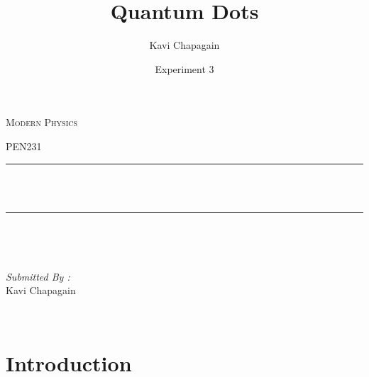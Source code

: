 \documentclass[12pt]{report}
\title{Quantum Dots}
\author{ Kavi Chapagain}
\date{Experiment 3}
\makeatletter
\let\thetitle\@title
\makeatother
\begin{document}

\begin{titlepage}
	\centering
    \vspace*{0.5 cm}
\begin{center}    \textsc{\Large   Modern Physics}\\[2.0 cm]	\end{center}%
	\textsc{\Large PEN231  }\\[0.5 cm]				%
	\rule{\linewidth}{0.2 mm} \\[0.4 cm]
	{ \huge \bfseries \thetitle}\\
	\rule{\linewidth}{0.2 mm} \\[1.5 cm]
	
	\begin{minipage}{0.4\textwidth}
		\begin{flushleft} \large
			\end{flushleft}
			\end{minipage}~
			\begin{minipage}{0.4\textwidth}
            
			\begin{flushright} \large
			\emph{Submitted By :} \\
			Kavi Chapagain  
		\end{flushright}
           
	\end{minipage}\\[2 cm]
	
    
    
	
\end{titlepage}


\tableofcontents
\pagebreak

\renewcommand{\thesection}{\arabic{section}}
\section{Introduction}
\end{document}
